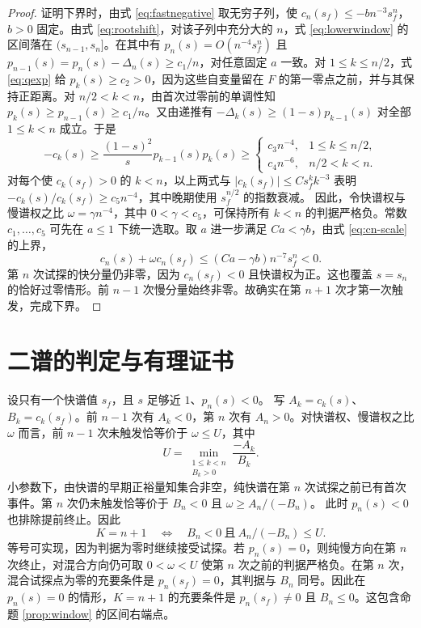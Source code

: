 \documentclass[11pt,a4paper,UTF8,fontset=fandol]{ctexart}
\begin{document}
\begin{proof}
证明下界时，由式 \eqref{eq:fastnegative} 取无穷子列，使
\(c_n(s_f)\le-b n^{-3}s_f^n\)，\(b>0\) 固定。由式 \eqref{eq:rootshift}，对该子列中充分大的 \(n\)，式 \eqref{eq:lowerwindow} 的区间落在 \((s_{n-1},s_n]\)。在其中有
\(p_n(s)=O(n^{-4}s_f^n)\) 且
\(p_{n-1}(s)=p_n(s)-\Delta_n(s)\ge c_1/n\)，对任意固定 \(a\) 一致。对 \(1\le k\le n/2\)，式 \eqref{eq:qexp} 给 \(p_k(s)\ge c_2>0\)，因为这些自变量留在 \(F\) 的第一零点之前，并与其保持正距离。对 \(n/2<k<n\)，由首次过零前的单调性知 \(p_k(s)\ge p_{n-1}(s)\ge c_1/n\)。又由递推有 \(-\Delta_k(s)\ge (1-s)p_{k-1}(s)\) 对全部 \(1\le k<n\) 成立。于是
\[
 -c_k(s)\ge \frac{(1-s)^2}{s}p_{k-1}(s)p_k(s)
 \ge
 \begin{cases}
  c_3n^{-4},&1\le k\le n/2,\\
  c_4n^{-6},&n/2<k<n.
 \end{cases}
\]
对每个使 \(c_k(s_f)>0\) 的 \(k<n\)，以上两式与
\(\lvert c_k(s_f)\rvert\le C s_f^k k^{-3}\) 表明
\(-c_k(s)/c_k(s_f)\ge c_5 n^{-4}\)，其中晚期使用 \(s_f^{n/2}\) 的指数衰减。
因此，令快谱权与慢谱权之比 \(\omega=\gamma n^{-4}\)，其中 \(0<\gamma<c_5\)，可保持所有 \(k<n\) 的判据严格负。常数 \(c_1,\ldots,c_5\) 可先在 \(a\le1\) 下统一选取。取 \(a\) 进一步满足 \(Ca<\gamma b\)，由式 \eqref{eq:cn-scale} 的上界，
\[
 c_n(s)+\omega c_n(s_f)\le (Ca-\gamma b)n^{-7}s_f^n<0 .
\]
第 \(n\) 次试探的快分量仍非零，因为 \(c_n(s_f)<0\) 且快谱权为正。这也覆盖 \(s=s_n\) 的恰好过零情形。前 \(n-1\) 次慢分量始终非零。故确实在第 \(n+1\) 次才第一次触发，完成下界。
\end{proof}

\section{二谱的判定与有理证书}
设只有一个快谱值 \(s_f\)，且 \(s\) 足够近 \(1\)、\(p_n(s)<0\)。
写 \(A_k=c_k(s)\)、\(B_k=c_k(s_f)\)。前 \(n-1\) 次有 \(A_k<0\)，第 \(n\) 次有 \(A_n>0\)。对快谱权、慢谱权之比 \(\omega\) 而言，前 \(n-1\) 次未触发恰等价于 \(\omega\le U\)，其中
\[
 U=\min_{\substack{1\le k<n\\ B_k>0}}\frac{-A_k}{B_k}.
\]
小参数下，由快谱的早期正裕量知集合非空，纯快谱在第 \(n\) 次试探之前已有首次事件。第 \(n\) 次仍未触发恰等价于 \(B_n<0\) 且 \(\omega\ge A_n/(-B_n)\)。
此时 \(p_n(s)<0\) 也排除提前终止。因此
\[
 K=n+1\quad\Longleftrightarrow\quad
 B_n<0\ \text{且}\ A_n/(-B_n)\le U .
\]
等号可实现，因为判据为零时继续接受试探。若 \(p_n(s)=0\)，则纯慢方向在第 \(n\) 次终止，对混合方向仍可取 \(0<\omega<U\) 使第 \(n\) 次之前的判据严格负。在第 \(n\) 次，混合试探点为零的充要条件是 \(p_n(s_f)=0\)，其判据与 \(B_n\) 同号。因此在 \(p_n(s)=0\) 的情形，\(K=n+1\) 的充要条件是 \(p_n(s_f)\ne0\) 且 \(B_n\le0\)。这包含命题 \ref{prop:window} 的区间右端点。
\end{document}
